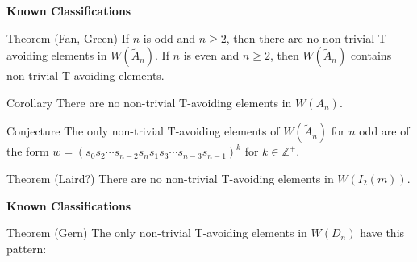 \documentclass{beamer}
\newcommand\heapblock[4]{\fill[fill=#4, fill opacity=0.35, draw=#4, line width=1.1pt, rounded corners,shift={(\xxaxis:#1)},shift={(\yyaxis:#2)}] (-1,-1) rectangle (1,1);\node at (#1,#2) {\footnotesize $#3$};}
\newcommand\xxaxis{0}
\newcommand\yyaxis{90}
\begin{document}


\begin{frame}{\textbf{Known Classifications}}

\begin{block}{Theorem (Fan, Green)}
	If $n$ is odd and $n \geq 2$, then there are no non-trivial T-avoiding elements in $W(\widetilde{A}_n)$. If $n$ is even and $n \geq 2$, then $W(\widetilde{A}_n)$ contains non-trivial T-avoiding elements.
\end{block}
\pause
\begin{block}{Corollary}
There are no non-trivial T-avoiding elements in $W(A_n)$.	
\end{block}
\pause
\begin{block}{Conjecture}
The only non-trivial T-avoiding elements of $W(\widetilde{A}_n)$ for $n$ odd are of the form $w=(s_0s_2 \cdots s_{n-2}s_ns_1s_3 \cdots s_{n-3}s_{n-1})^k$  for $k \in \mathbb{Z}^+$.	
\end{block}

\pause
\begin{block}{Theorem (Laird?)}
	There are no non-trivial T-avoiding elements in $W(I_2(m))$.
\end{block}

\end{frame}




\begin{frame}{\textbf{Known Classifications}}

\begin{block}{Theorem (Gern)}
The only non-trivial T-avoiding elements in $W(D_n)$ have this pattern:	
\end{block}

\begin{figure}
\end{figure}
	
\end{frame}
\end{document}
